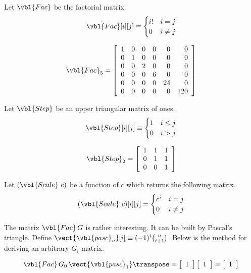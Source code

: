 Let $\vbl{Fac}$ be the factorial matrix.
\begin{equation}
 \label{eq:def_Fac}
 \vbl{Fac}[i][j] \equiv
 \begin{cases}
  i! & i = j \\
  0 & i \ne j
 \end{cases}
\end{equation}

\[
 \vbl{Fac}_5 =
\left[
\begin{array}{rrrrrr}
 1 & 0 & 0 & 0 &  0 &   0 \\
 0 & 1 & 0 & 0 &  0 &   0 \\
 0 & 0 & 2 & 0 &  0 &   0 \\
 0 & 0 & 0 & 6 &  0 &   0 \\
 0 & 0 & 0 & 0 & 24 &   0 \\
 0 & 0 & 0 & 0 &  0 & 120 \\
\end{array}
\right]
\]

Let $\vbl{Step}$ be an upper triangular matrix of ones.
\begin{equation}
 \label{eq:def_Step}
 \vbl{Step}[i][j] \equiv
 \begin{cases}
  1 & i \le j \\
  0 & i > j
 \end{cases}
\end{equation}

\[
 \vbl{Step}_2 =
\left[
\begin{array}{rrr}
 1 & 1 & 1 \\
 0 & 1 & 1 \\
 0 & 0 & 1 \\
\end{array}
\right]
\]

Let $(\vbl{Scale}\ c)$ be a function of $c$ which returns the following matrix.
\begin{equation}
 \label{eq:def_Scale}
 (\vbl{Scale}\ c)[i][j] =
 \begin{cases}
  c^i & i = j \\
  0 & i \ne j
 \end{cases}
\end{equation}


The matrix $\vbl{Fac}\,G$ is rather interesting.
It can be built by Pascal's triangle.
Define $\vect{\vbl{pasc}_n} [i]\equiv (-1)^i {n \choose i+1}$.
Below is the method for deriving an arbitrary $G_i$ matrix.

\[
 \vbl{Fac}\,G_0\,\vect{\vbl{pasc}_1}\transpose =
 \left[\begin{array}{r}
   1 \\
 \end{array}\right]
 \left[\begin{array}{r}
   1 \\
 \end{array}\right]
 =
 \left[\begin{array}{r}
   1 \\
 \end{array}\right]
\]

